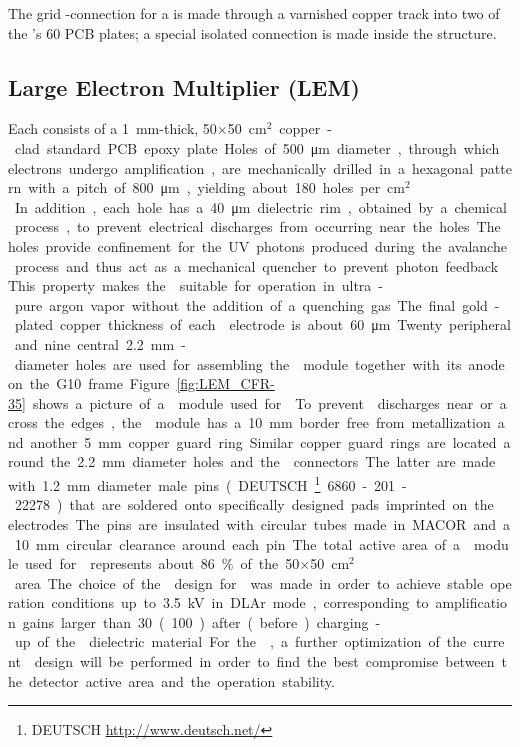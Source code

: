 The grid -connection for a  is made through a varnished copper track into two of the 's \num{60} PCB plates; a special isolated connection %
is made inside the  structure.

\subsection{Large Electron Multiplier (LEM)}
\label{sec:fddp-crp-lem}

Each  consists of a \SI{1}{mm}-thick,  \num{50}$\times$\SI{50}{cm$^{2}$} copper-clad standard PCB epoxy plate. Holes of \SI{500}{\micro\meter} diameter, through which electrons undergo amplification, are mechanically drilled in a hexagonal pattern with a pitch of \SI{800}{\micro\meter}, yielding about \num{180} holes per \si{cm$^2$}. In addition, each hole has a  \SI{40}{\micro\meter} dielectric rim, obtained by a chemical process, to prevent electrical discharges from occurring near the holes. The holes provide confinement for the UV photons produced during the avalanche process and thus act as a mechanical quencher to prevent photon feedback. This property makes the  suitable for operation in ultra-pure argon vapor without the addition of a quenching gas. The final gold-plated copper thickness of each  electrode is about  \SI{60}{\micro\meter}. Twenty peripheral and nine central \SI{2.2}{mm}-diameter holes are used for assembling the  module together with its anode on the G10 frame. Figure~\ref{fig:LEM_CFR-35} shows a picture of a  module used for  . To prevent  discharges near or across the edges, the  module has a  \SI{10}{mm} border free from metallization and another \SI{5}{mm} copper guard ring. Similar copper guard rings are located around the \SI{2.2}{mm} diameter holes and the  connectors. The latter are made with \SI{1.2}{mm} diameter male pins (DEUTSCH~\footnote{DEUTSCH\texttrademark{} \url{http://www.deutsch.net/}} 6860-201-22278) that are soldered onto specifically designed pads imprinted on the  electrodes. The pins are insulated with circular tubes made in MACOR and a  \SI{10}{mm} circular clearance around each pin. 

The total active area of a  module used for   represents about \SI{86}{\%} of the \num{50}$\times$\SI{50}{cm$^{2}$} area. The choice of the  design for   was made in order to achieve stable operation conditions up to \SI{3.5}{kV} in DLAr mode, corresponding to amplification gains larger than \num{30} (\num{100}) after (before) charging-up of the  dielectric material. For the , a further optimization of the current  design will  be performed in order  to find the best compromise between the detector active area and the operation stability.

